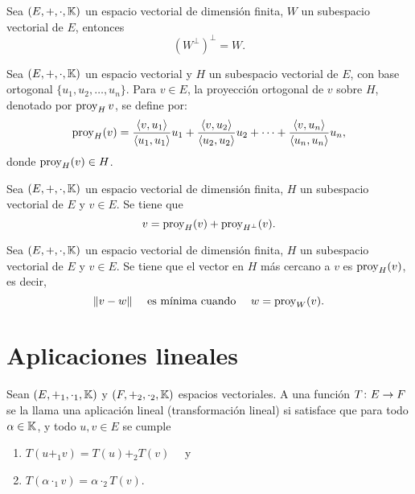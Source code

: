 \documentclass[a4,11pt]{aleph-notas}
\begin{document}
\begin{teo}
    Sea $(E,+,\cdot,\mathbb{K})$ un espacio vectorial de dimensión finita, $W$ un subespacio vectorial de $E$, entonces 
    \[
    \left(W^\perp\right)^\perp =  W.
    \]
\end{teo}

\begin{defi}
    Sea $(E,+,\cdot,\mathbb{K})$ un espacio vectorial y
    $H$ un subespacio vectorial de $E$, con base ortogonal $\{u_1, u_2, \ldots, u_n \}$. Para $v \in E$, la proyección ortogonal de $v$ sobre $H$, denotado por $\operatorname{proy}_H v$, se define por:
    \[
       \operatorname{proy}_H( v) = 
       \dfrac{\langle v,u_1 \rangle}{\langle u_1, u_1 \rangle}u_1 +
       \dfrac{\langle v,u_2 \rangle}{\langle u_2, u_2 \rangle}u_2 +
       \cdots +
       \dfrac{\langle v,u_n \rangle}{\langle u_n, u_n \rangle}u_n,
    \]
    donde $\operatorname{proy}_H (v) \in H$.
\end{defi}


\begin{teo}
    Sea $(E,+,\cdot,\mathbb{K})$ un espacio vectorial de dimensión finita, $H$ un subespacio vectorial de $E$ y $v \in E$. Se tiene que
    \[
        v = \operatorname{proy}_H( v) + \operatorname{proy}_{H^\perp}( v).
    \]
\end{teo}

\begin{teo}
    Sea $(E,+,\cdot,\mathbb{K})$ un espacio vectorial de dimensión finita, $H$ un subespacio vectorial de $E$ y $v \in E$. Se tiene que el vector en $H$ más cercano a $v$ es $\operatorname{proy}_H(v)$, es decir,
    \[
    \|v-w\| \quad \text{ es mínima cuando } \quad w = \operatorname{proy}_W(v).
    \]
\end{teo}


\section{Aplicaciones lineales}

\begin{defi}
    Sean $(E,+_1,\cdot_1,\mathbb{K})$ y $(F,+_2,\cdot_2,\mathbb{K})$ espacios vectoriales. A una función $T\colon E \rightarrow F$ se la llama una aplicación lineal (transformación lineal) si satisface que para todo $\alpha \in \mathbb{K}$, y todo $u,v \in E$ se cumple
    \begin{enumerate}
    \item 
        $T(u +_1 v) = T(u) +_2 T(v)\quad$ y
    \item 
        $T(\alpha \cdot_1 v ) = \alpha \cdot_2 T(v)$.
    \end{enumerate}
\end{defi}
\end{document}
